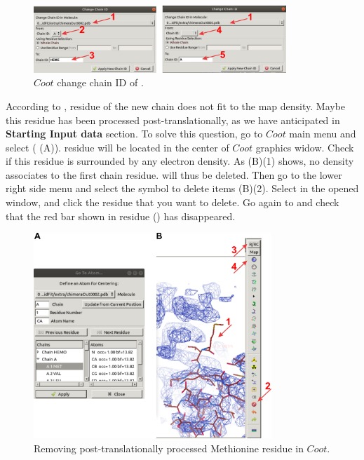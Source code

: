 \begin{itemize}
 \begin{figure}[H]
  \centering 
  \captionsetup{width=.7\linewidth} 
  \includegraphics[width=0.85\textwidth]{Images/Fig26.png}
  \caption{$Coot$ change chain ID of  .}
  \label{fig:coot_change_name_ID}
  \end{figure}
  
  According to ,  residue of the new chain  does not fit to the map density. Maybe this residue has been processed post-translationally, as we have anticipated in \textbf{Starting Input data} section. To solve this question, go to $Coot$ main menu and select  ( (A)).  residue will be located in the center of $Coot$ graphics widow. Check if this residue is surrounded by any electron density. As  (B)(1) shows, no density associates to the first chain residue.  will thus be deleted. Then go to the lower right side menu and select the symbol to delete items (B)(2). Select  in the opened  window, and click the  residue that you want to delete. Go again to  and check that the red bar shown in  residue () has disappeared.
  
  \begin{figure}[H]
  \centering 
  \captionsetup{width=.7\linewidth} 
  \includegraphics[width=0.80\textwidth]{Images/Fig27.png}
  \caption{Removing post-translationally processed Methionine residue in $Coot$.}
  \label{fig:coot_go_to_atom}
  \end{figure}
  

\end{itemize}
